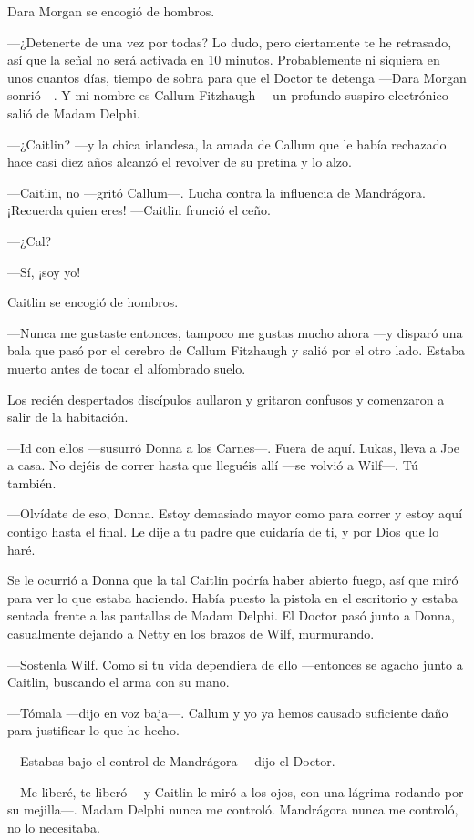 Dara Morgan se encogió de hombros.

---¿Detenerte de una vez por todas? Lo dudo, pero ciertamente te he
retrasado, así que la señal no será activada en 10 minutos.
Probablemente ni siquiera en unos cuantos días, tiempo de sobra para que
el Doctor te detenga ---Dara Morgan sonrió---. Y mi nombre es Callum
Fitzhaugh ---un profundo suspiro electrónico salió de Madam Delphi.

---¿Caitlin? ---y la chica irlandesa, la amada de Callum que le había
rechazado hace casi diez años alcanzó el revolver de su pretina y lo
alzo.

---Caitlin, no ---gritó Callum---. Lucha contra la influencia de
Mandrágora. ¡Recuerda quien eres! ---Caitlin frunció el ceño.

---¿Cal?

---Sí, ¡soy yo!

Caitlin se encogió de hombros.

---Nunca me gustaste entonces, tampoco me gustas mucho ahora ---y
disparó una bala que pasó por el cerebro de Callum Fitzhaugh y salió por
el otro lado. Estaba muerto antes de tocar el alfombrado suelo.

Los recién despertados discípulos aullaron y gritaron confusos y
comenzaron a salir de la habitación.

---Id con ellos ---susurró Donna a los Carnes---. Fuera de aquí. Lukas,
lleva a Joe a casa. No dejéis de correr hasta que lleguéis allí ---se
volvió a Wilf---. Tú también.

---Olvídate de eso, Donna. Estoy demasiado mayor como para correr y
estoy aquí contigo hasta el final. Le dije a tu padre que cuidaría de
ti, y por Dios que lo haré.

Se le ocurrió a Donna que la tal Caitlin podría haber abierto fuego, así
que miró para ver lo que estaba haciendo. Había puesto la pistola en el
escritorio y estaba sentada frente a las pantallas de Madam Delphi. El
Doctor pasó junto a Donna, casualmente dejando a Netty en los brazos de
Wilf, murmurando.

---Sostenla Wilf. Como si tu vida dependiera de ello ---entonces se
agacho junto a Caitlin, buscando el arma con su mano.

---Tómala ---dijo en voz baja---. Callum y yo ya hemos causado
suficiente daño para justificar lo que he hecho.

---Estabas bajo el control de Mandrágora ---dijo el Doctor.

---Me liberé, te liberó ---y Caitlin le miró a los ojos, con una lágrima
rodando por su mejilla---. Madam Delphi nunca me controló. Mandrágora
nunca me controló, no lo necesitaba.

